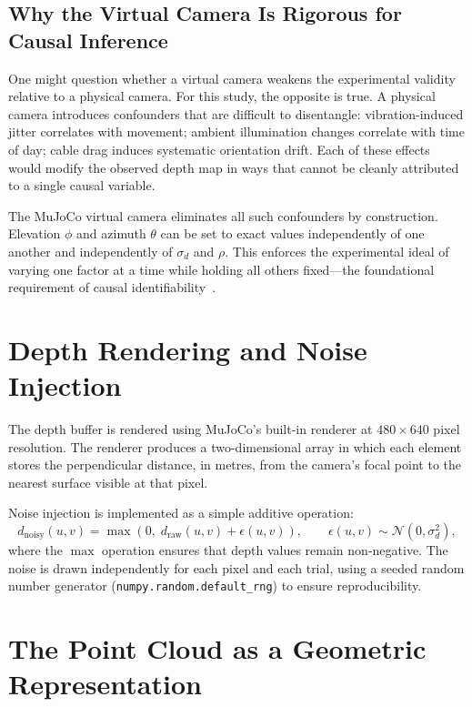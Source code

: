 \documentclass[11pt,a4paper]{report}
\begin{document}
\subsection{Why the Virtual Camera Is Rigorous for Causal Inference}

One might question whether a virtual camera weakens the experimental validity relative to a physical camera. For this study, the opposite is true. A physical camera introduces confounders that are difficult to disentangle: vibration-induced jitter correlates with movement; ambient illumination changes correlate with time of day; cable drag induces systematic orientation drift. Each of these effects would modify the observed depth map in ways that cannot be cleanly attributed to a single causal variable.

The MuJoCo virtual camera eliminates all such confounders by construction. Elevation $\phi$ and azimuth $\theta$ can be set to exact values independently of one another and independently of $\sigma_d$ and $\rho$. This enforces the experimental ideal of varying one factor at a time while holding all others fixed---the foundational requirement of causal identifiability~\cite{pearl2009causality}.

\section{Depth Rendering and Noise Injection}
\label{sec:depth_rendering}

The depth buffer is rendered using MuJoCo's built-in renderer at $480 \times 640$ pixel resolution. The renderer produces a two-dimensional array in which each element stores the perpendicular distance, in metres, from the camera's focal point to the nearest surface visible at that pixel.

Noise injection is implemented as a simple additive operation:
\begin{equation}
  d_{\text{noisy}}(u, v) = \max\!\left(0,\; d_{\text{raw}}(u, v) + \epsilon(u, v)\right),
  \qquad \epsilon(u, v) \sim \mathcal{N}(0, \sigma_d^2),
  \label{eq:noise_injection}
\end{equation}
where the $\max$ operation ensures that depth values remain non-negative. The noise is drawn independently for each pixel and each trial, using a seeded random number generator (\texttt{numpy.random.default\_rng}) to ensure reproducibility.

\section{The Point Cloud as a Geometric Representation}
\label{sec:pointcloud_definition}
\end{document}
